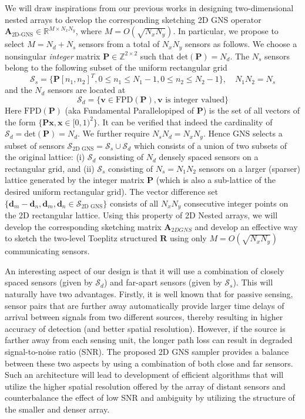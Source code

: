  We will draw inspirations from our previous works in designing two-dimensional nested arrays \cite{PiyaNested2D} to develop the corresponding sketching 2D GNS operator $\mathbf{A}_{\text{2D-GNS}} \in \mathbb{R}^{M \times {N_xN_y}}$, where $M = O(\sqrt{N_xN_y})$. In particular, we propose to select $M=N_d+N_s$ sensors from a total of $N_xN_y$ sensors as follows. We choose a nonsingular {\em integer} matrix $\mathbf{P}\in \mathbb{Z}^{2\times 2}$ such that $\text{det}(\mathbf{P})=N_d$. The $N_s$ sensors belong to the following subset  of the uniform rectangular grid \[ \mathcal{S}_{s} = \{\mathbf{P}[n_1,n_2]^{T}, 0\leq n_1\leq N_1-1, 0\leq n_2\leq N_2-1 \} ,\quad N_1N_2 = N_s \]
and the $N_d$ sensors are located at \[ \mathcal{S}_d = \{ \mathbf{v} \in \text{FPD}(\mathbf{P}), \mathbf{v} \text{ is integer valued} \} \] 
%
Here $\text{FPD}(\mathbf{P})$ (aka Fundamental Parallelopiped of $\mathbf{P}$)  is the set of all vectors of the form $\{\mathbf{Px}, \mathbf{x}\in[0,1)^2 \}$. It can be verified that indeed the cardinality of $\mathcal{S}_d = \text{det}(\mathbf{P}) = N_d$. We further require $N_sN_d = N_xN_y$. Hence GNS selects a subset of sensors $\mathcal{S}_{\text{2D GNS}} = \mathcal{S}_s\cup \mathcal{S}_d$ which consists of a union of two subsets of the original lattice: (i) $\mathcal{S}_d$ consisting of $N_d$ densely spaced sensors on a rectangular grid, and (ii) $\mathcal{S}_s$ consisting of $N_s = N_1N_2$ sensors on a larger (sparser) lattice generated by the integer matrix $\mathbf{P}$ (which is also a sub-lattice of the desired uniform rectangular grid). The vector difference set $\{\mathbf{d}_m-\mathbf{d}_n, \mathbf{d}_m,\mathbf{d}_n\in \mathcal{S}_{\text{2D GNS}}\}$ consists of all $N_xN_y$ consecutive integer points on the 2D rectangular lattice. Using this property of 2D Nested arrays, we will develop the corresponding sketching matrix $\mathbf{A}_{2D GNS}$ and develop an effective way to sketch the two-level Toeplitz structured $\mathbf{R}$ using only $M = O(\sqrt{N_xN_y})$ communicating sensors. 

An interesting aspect of our design is that it will use a combination of closely spaced sensors (given by $\mathcal{S}_d$) and far-apart sensors (given by $\mathcal{S}_s$). This will naturally have two advantages. 
Firstly,  it is well known that for passive sensing, sensor pairs that are further away automatically provide larger time delays of arrival between signals from two different sources, thereby resulting in higher accuracy of detection (and better spatial resolution). However, if the source is farther away from each sensing unit, the longer path loss can result in degraded signal-to-noise ratio (SNR). The proposed 2D GNS sampler provides a balance between these two aspects by using a combination of both close and far sensors. Such an architecture will lead to development of efficient algorithms that will utilize the higher spatial resolution offered by the array of distant sensors and counterbalance the effect of low SNR and ambiguity by utilizing the structure of the smaller and denser array. 

